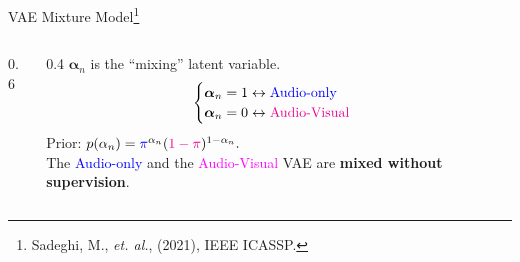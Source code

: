 \documentclass[aspectratio=169]{beamer}
\newcommand{\bs}[1]{\boldsymbol{#1}}
\begin{document}
\begin{frame}{VAE Mixture Model\footnote{Sadeghi, M., \textit{et. al.}, (2021), IEEE ICASSP.}}
  \begin{columns}
 \centering
  \begin{column}{0.6\textwidth}
    \resizebox{\textwidth}{!}{}
  \end{column}
  \begin{column}{0.4\textwidth}
    $\bs{\alpha}_n$ is the ``mixing'' latent variable.\vspace{-2mm}
    \[\begin{cases}
       \bs{\alpha}_n=1 \leftrightarrow \text{\color{blue}Audio-only}\\
       \bs{\alpha}_n=0 \leftrightarrow \text{\color{magenta}Audio-Visual}
      \end{cases}\vspace{-2mm}
    \]
    Prior: $p(\alpha_n) = \textcolor{blue}{\pi}^{\alpha_n} (\textcolor{magenta}{1-\pi})^{1-\alpha_n}.$\vspace{8mm}\\
    The \textcolor{blue}{Audio-only} and the \textcolor{magenta}{Audio-Visual} VAE are \textbf{\alert{mixed without supervision}}.
  \end{column}
 \end{columns}
\end{frame}
\end{document}
